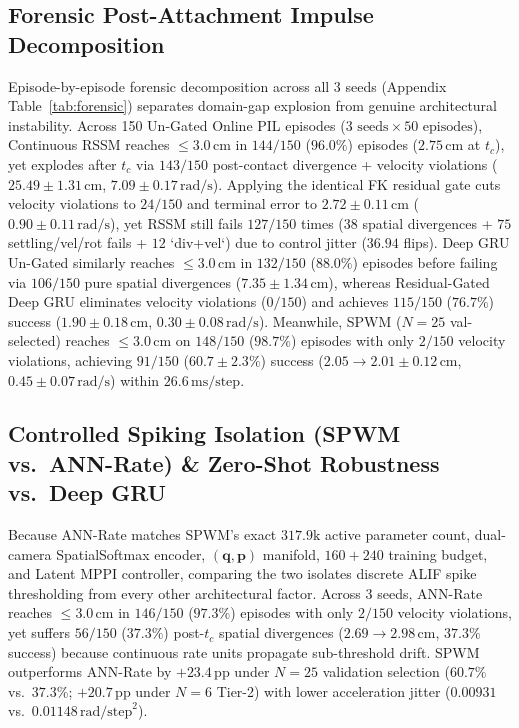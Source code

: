 \documentclass[11pt]{article}
\begin{document}
\subsection{Forensic Post-Attachment Impulse Decomposition}

Episode-by-episode forensic decomposition across all 3 seeds (Appendix Table~\ref{tab:forensic}) separates domain-gap explosion from genuine architectural instability. Across 150 Un-Gated Online PIL episodes ($3\text{ seeds} \times 50\text{ episodes}$), Continuous RSSM reaches $\le 3.0\,\text{cm}$ in $144/150$ ($96.0\%$) episodes ($2.75\,\text{cm}$ at $t_c$), yet explodes after $t_c$ via $143/150$ post-contact divergence + velocity violations ($25.49 \pm 1.31\,\text{cm}$, $7.09 \pm 0.17\,\text{rad/s}$). Applying the identical FK residual gate cuts velocity violations to $24/150$ and terminal error to $2.72 \pm 0.11\,\text{cm}$ ($0.90 \pm 0.11\,\text{rad/s}$), yet RSSM still fails $127/150$ times ($38$ spatial divergences + $75$ settling/vel/rot fails + $12$ `div+vel`) due to control jitter ($36.94$ flips). Deep GRU Un-Gated similarly reaches $\le 3.0\,\text{cm}$ in $132/150$ ($88.0\%$) episodes before failing via $106/150$ pure spatial divergences ($7.35 \pm 1.34\,\text{cm}$), whereas Residual-Gated Deep GRU eliminates velocity violations ($0/150$) and achieves $115/150$ ($76.7\%$) success ($1.90 \pm 0.18\,\text{cm}$, $0.30 \pm 0.08\,\text{rad/s}$). Meanwhile, SPWM ($N=25$ val-selected) reaches $\le 3.0\,\text{cm}$ on $148/150$ ($98.7\%$) episodes with only $2/150$ velocity violations, achieving $91/150$ ($60.7 \pm 2.3\%$) success ($2.05 \to 2.01 \pm 0.12\,\text{cm}$, $0.45 \pm 0.07\,\text{rad/s}$) within $26.6\,\text{ms/step}$.

\subsection{Controlled Spiking Isolation (SPWM vs.\ ANN-Rate) \& Zero-Shot Robustness vs.\ Deep GRU}

Because ANN-Rate matches SPWM's exact $317.9\text{k}$ active parameter count, dual-camera SpatialSoftmax encoder, $(\mathbf{q}, \mathbf{p})$ manifold, $160+240$ training budget, and Latent MPPI controller, comparing the two isolates discrete ALIF spike thresholding from every other architectural factor. Across 3 seeds, ANN-Rate reaches $\le 3.0\,\text{cm}$ in $146/150$ ($97.3\%$) episodes with only $2/150$ velocity violations, yet suffers $56/150$ ($37.3\%$) post-$t_c$ spatial divergences ($2.69 \to 2.98\,\text{cm}$, $37.3\%$ success) because continuous rate units propagate sub-threshold drift. SPWM outperforms ANN-Rate by $+23.4\,\text{pp}$ under $N=25$ validation selection ($60.7\%$ vs.\ $37.3\%$; $+20.7\,\text{pp}$ under $N=6$ Tier-2) with lower acceleration jitter ($0.00931$ vs.\ $0.01148\,\text{rad/step}^2$).
\end{document}
